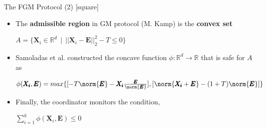 \begin{frame}{The FGM Protocol (2)}
    [square]
    \begin{itemize}
        \item{The \textbf{admissible region} in GM protocol (M. Kamp) is the \textbf{convex set}
        \newline
        \begin{center}
            $A=\{\pmb{X}_i\in\mathbb{R}^d\:\:|\:\:||\pmb{X}_i-\pmb{E}||_2^2 - T \leq 0\}$
        \end{center}
        }
        \vspace{0.4cm}
        \item{Samoladas et al. constructed the concave function $\phi:\mathbb{R}^d\rightarrow\mathbb{R}$ that is safe for $A$ as
        \newline
        \begin{center}
            $\phi(\pmb{X_i},\pmb{E}) = max\{[-T\norm{\pmb{E}} - \pmb{X_i}\frac{\pmb{E}}{\norm{\pmb{E}}}], [\norm{\pmb{X_i}+\pmb{E}} - (1+T)\norm{\pmb{E}}]\}$
        \end{center}
        }
        \vspace{0.4cm}
        \item{Finally, the coordinator monitors the condition,
        \newline
        \begin{center}
            $\sum_{i=1}^k\phi(\pmb{X}_i,\pmb{E}) \leq 0$
        \end{center}
        }
    \end{itemize}
\end{frame}

